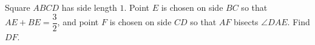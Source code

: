 Square $ABCD$ has side length $1$. Point $E$ is chosen on side $BC$ so that $AE+BE=\dfrac{3}{2}$, and point $F$ is chosen on side $CD$ so that $AF$ bisects $\angle DAE$. Find $DF$.
